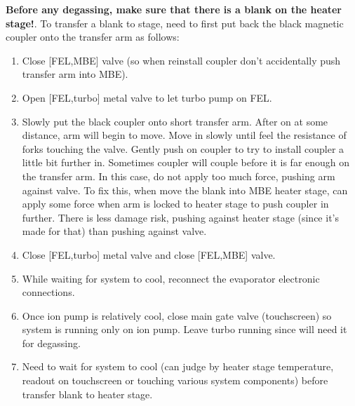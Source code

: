 \begin{enumerate}
\textbf{Before any degassing, make sure that there is a blank on the heater stage!}. To transfer a blank to stage, need to first put back the black magnetic coupler onto the transfer arm as follows:
\begin{enumerate}
	\item Close [FEL,MBE] valve (so when reinstall coupler don’t accidentally push transfer arm into MBE). 
	\item Open [FEL,turbo] metal valve to let turbo pump on FEL.
    \item Slowly put the black coupler onto short transfer arm. After on at some distance, arm will begin to move. Move in slowly until feel the resistance of forks touching the valve. Gently push on coupler to try to install coupler a little bit further in. Sometimes coupler will couple before it is far enough on the transfer arm. In this case, do not apply too much force, pushing arm against valve. To fix this, when move the blank into MBE heater stage, can apply some force when arm is locked to heater stage to push coupler in further. There is less damage risk, pushing against heater stage (since it’s made for that) than pushing against valve.
	\item 	Close [FEL,turbo] metal valve and close [FEL,MBE] valve.
    \item While waiting for system to cool, reconnect the evaporator electronic connections.
	\item Once ion pump is relatively cool, close main gate valve (touchscreen) so system is running only on ion pump. Leave turbo running since will need it for degassing.
	\item Need to wait for system to cool (can judge by heater stage temperature, readout on touchscreen or touching various system components) before transfer blank to heater stage.
\end{enumerate}


\end{enumerate}
